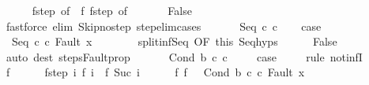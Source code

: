 \begin{isabellebody}
\ \ \ \ \isamarkupfalse%
\ f{\isacharunderscore}step\ {\isacharbrackleft}of\ {}{\isacharbrackright}\ f{\isacharunderscore}{}\ f{\isacharunderscore}step\ {\isacharbrackleft}of\ {}{\isacharbrackright}\isanewline
\ \ \ \ \isamarkupfalse%
\ False\isanewline
\ \ \ \ \ \ \isamarkupfalse%
\ {\isacharparenleft}fastforce\ elim{\isacharcolon}\ Skip{\isacharunderscore}no{\isacharunderscore}step\ step{\isacharunderscore}elim{\isacharunderscore}cases{\isacharparenright}\isanewline
\ \ \isamarkupfalse%
\isanewline
{}\isamarkupfalse%
\isanewline
\ \ \isamarkupfalse%
\ {\isacharparenleft}Seq\ c\ c\isanewline
\ \ \isamarkupfalse%
\ {\isacharquery}case\isanewline
\ \ \isamarkupfalse%
\ \isanewline
\ \ \ \ \isamarkupfalse%
\ {\isachardoublequoteopen}{\isasymGamma}{\isasymturnstile}\ {\isacharparenleft}Seq\ c\ c\ Fault\ x{\isacharparenright}\ {\isasymrightarrow}\ {\isasymdots}{\isacharparenleft}{\isasyminfinity}{\isacharparenright}{\isachardoublequoteclose}\isanewline
\ \ \ \ \isamarkupfalse%
\ split{\isacharunderscore}inf{\isacharunderscore}Seq\ {\isacharbrackleft}OF\ this{\isacharbrackright}\ Seq{\isachardot}hyps\isanewline
\ \ \ \ \isamarkupfalse%
\ False\isanewline
\ \ \ \ \ \ \isamarkupfalse%
\ {\isacharparenleft}auto\ dest{\isacharcolon}\ steps{\isacharunderscore}Fault{\isacharunderscore}prop{\isacharparenright}\isanewline
\ \ \isamarkupfalse%
\isanewline
{}\isamarkupfalse%
\isanewline
\ \ \isamarkupfalse%
\ {\isacharparenleft}Cond\ b\ c\ c\ \isanewline
\ \ \isamarkupfalse%
\ {\isacharquery}case\ \isanewline
\ \ \isamarkupfalse%
\ {\isacharparenleft}rule\ not{\isacharunderscore}infI{\isacharparenright}\isanewline
\ \ \ \ \isamarkupfalse%
\ f\isanewline
\ \ \ \ \isamarkupfalse%
\ f{\isacharunderscore}step{\isacharcolon}\ {\isachardoublequoteopen}{\isasymAnd}i{\isachardot}\ {\isasymGamma}{\isasymturnstile}f\ i\ {\isasymrightarrow}\ f\ {\isacharparenleft}Suc\ i{\isacharparenright}{\isachardoublequoteclose}\isanewline
\ \ \ \ \isamarkupfalse%
\ f{\isacharunderscore}{}{\isacharcolon}\ {\isachardoublequoteopen}f\ {}\ {\isacharequal}\ {\isacharparenleft}Cond\ b\ c\ c\ Fault\ x{\isacharparenright}{\isachardoublequoteclose}\ \isanewline

\end{isabellebody}
